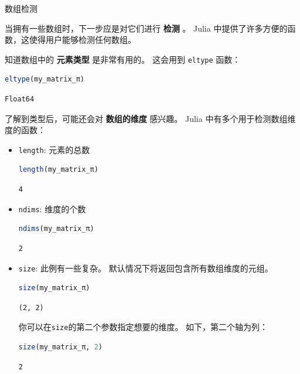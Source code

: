 \documentclass[
  notoc %
]{tufte-book}
\makeatletter
\newcommand{\passthrough}[1]{#1}
\renewcommand\subsubsection{%
\@startsection{subsubsection}{3}{\z@ }{-3.25ex\@plus -1ex \@minus -.2ex}{1.5ex \@plus .2ex}{\normalfont \normalsize \bfseries }
}
\makeatother
\begin{document}
\hypertarget{sec:array_inspection}{%
\subsubsection{数组检测}\label{sec:array_inspection}}

当拥有一些数组时，下一步应是对它们进行 \textbf{检测} 。 Julia
中提供了许多方便的函数，这使得用户能够检测任何数组。

知道数组中的 \textbf{元素类型} 是非常有用的。 这会用到
\passthrough{\lstinline!eltype!} 函数：

\begin{lstlisting}[language=Julia]
eltype(my_matrix_π)
\end{lstlisting}

\begin{lstlisting}[language=Output]
Float64
\end{lstlisting}

了解到类型后，可能还会对 \textbf{数组的维度} 感兴趣。 Julia
中有多个用于检测数组维度的函数：

\begin{itemize}
\item
  \passthrough{\lstinline!length!}: 元素的总数

  \begin{lstlisting}[language=Julia]
  length(my_matrix_π)
  \end{lstlisting}

  \begin{lstlisting}[language=Output]
  4
  \end{lstlisting}
\item
  \passthrough{\lstinline!ndims!}: 维度的个数

  \begin{lstlisting}[language=Julia]
  ndims(my_matrix_π)
  \end{lstlisting}

  \begin{lstlisting}[language=Output]
  2
  \end{lstlisting}
\item
  \passthrough{\lstinline!size!}: 此例有一些复杂。
  默认情况下将返回包含所有数组维度的元组。

  \begin{lstlisting}[language=Julia]
  size(my_matrix_π)
  \end{lstlisting}

  \begin{lstlisting}[language=Output]
  (2, 2)
  \end{lstlisting}

  你可以在\passthrough{\lstinline!size!}的第二个参数指定想要的维度。
  如下，第二个轴为列：

  \begin{lstlisting}[language=Julia]
  size(my_matrix_π, 2)
  \end{lstlisting}

  \begin{lstlisting}[language=Output]
  2
  \end{lstlisting}
\end{itemize}
\end{document}
